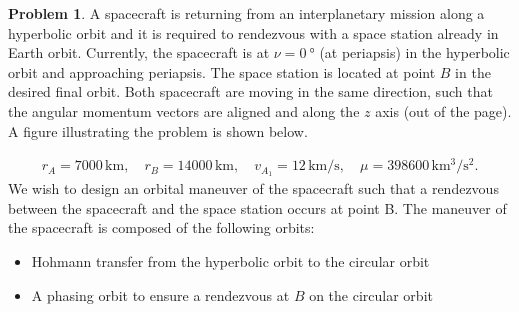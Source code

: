 \documentclass[10pt]{article}
\theoremstyle{definition}
\newtheorem{prob}{Problem}[section]
\begin{document}
\clearpage\newpage
\begin{prob}
A spacecraft is returning from an interplanetary mission along a hyperbolic orbit and it is required to rendezvous with a space station already in Earth orbit.
Currently, the spacecraft is at \( \nu = \SI{0}{\degree} \) (at periapsis) in the hyperbolic orbit and approaching periapsis.
The space station is located at point \( B\) in the desired final orbit.
Both spacecraft are moving in the same direction, such that the angular momentum vectors are aligned and along the \( z \) axis (out of the  page).
A figure illustrating the problem is shown below.

\begin{figure}[htbp]
    \centering
    \begin{scaletikzpicturetowidth}{\textwidth}
\end{scaletikzpicturetowidth}
\end{figure}
\begin{gather*}
r_A=7000\,\mathrm{km},\quad r_B=14000\,\mathrm{km},\quad v_{A_1}=12\,\mathrm{km/s},\quad \mu =398600\,\mathrm{km^3/s^2}.
\end{gather*}
We wish to design an orbital maneuver of the spacecraft such that a rendezvous between the spacecraft and the space station occurs at point B. 
The maneuver of the spacecraft is composed of the following orbits:

\begin{itemize}
    \item Hohmann transfer from the hyperbolic orbit to the circular orbit
    \item A phasing orbit to ensure a rendezvous at $B$ on the circular orbit
\end{itemize}


\end{prob}
\end{document}
